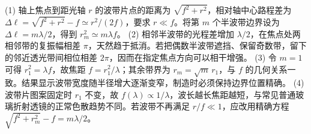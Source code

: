 (1) 轴上焦点到距光轴 \(r\) 的波带片点的距离为 \(\sqrt{f^2+r^2}\)，相对轴中心路程差为 \(\Delta\ell=\sqrt{f^2+r^2}-f\simeq r^2/(2f)\)，要求 \(r\ll f\)。将第 \(m\) 个半波带边界设为 \(\Delta\ell=m\lambda/2\)，得到 \(r_m^2\simeq m\lambda f\)。
(2) 相邻半波带的光程差增加 \(\lambda/2\)，在焦点处两相邻带的复振幅相差 \(\pi\)，天然趋于抵消。若把偶数半波带遮挡、保留奇数带，留下的邻近透光带间相位相差 \(2\pi\)，因而在指定焦点方向可以相干增强。
(3) 令 \(m=1\) 可得 \(r_1^2=\lambda f\)，故焦距 \(f=r_1^2/\lambda\)；其余带界为 \(r_m=\sqrt m\,r_1\)，与 \(f\) 的几何关系一致。结果显示波带宽度随半径增大逐渐变窄，制造时必须保持边界位置精确。
(4) 波带片图案固定时 \(r_1\) 不变，故 \(f(\lambda)\propto1/\lambda\)，波长越长焦距越短，与常见普通玻璃折射透镜的正常色散趋势不同。若波带不再满足 \(r/f\ll1\)，应改用精确方程 \(\sqrt{f^2+r_m^2}-f=m\lambda/2\)。
